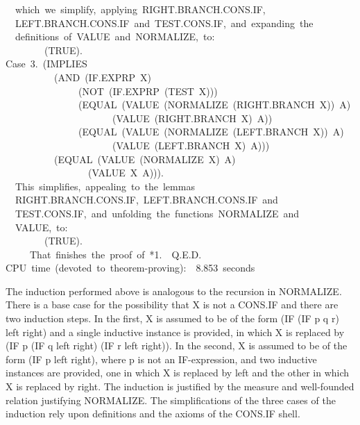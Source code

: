 \documentclass[11pt]{book}
\newenvironment{pubasis}{\begin{flushleft}\ttfamily\small}{\normalsize\rmfamily\end{flushleft}}
\begin{document}
\begin{pubasis}
~~which~we~simplify,~applying~RIGHT.BRANCH.CONS.IF,\\
~~LEFT.BRANCH.CONS.IF~and~TEST.CONS.IF,~and~expanding~the\\
~~definitions~of~VALUE~and~NORMALIZE,~to:\\

~~~~~~~~(TRUE).\\

Case~3.~(IMPLIES\\
~~~~~~~~~~(AND~(IF.EXPRP~X)\\
~~~~~~~~~~~~~~~(NOT~(IF.EXPRP~(TEST~X)))\\
~~~~~~~~~~~~~~~(EQUAL~(VALUE~(NOR\-MAL\-IZE~(RIGHT.BRANCH~X))~A)\\
~~~~~~~~~~~~~~~~~~~~~~(VALUE~(RIGHT.BRANCH~X)~A))\\
~~~~~~~~~~~~~~~(EQUAL~(VALUE~(NOR\-MAL\-IZE~(LEFT.BRANCH~X))~A)\\
~~~~~~~~~~~~~~~~~~~~~~(VALUE~(LEFT.BRANCH~X)~A)))\\
~~~~~~~~~~(EQUAL~(VALUE~(NORMALIZE~X)~A)\\
~~~~~~~~~~~~~~~~~(VALUE~X~A))).\\

~~This~simplifies,~appealing~to~the~lemmas\\
~~RIGHT.BRANCH.CONS.IF,~LEFT.BRANCH.CONS.IF~and\\
~~TEST.CONS.IF,~and~unfolding~the~functions~NOR\-MAL\-IZE~and\\
~~VALUE,~to:\\

~~~~~~~~(TRUE).\\

~~~~~That~finishes~the~proof~of~*1.~~Q.E.D.\\

CPU~time~(devoted~to~theorem-proving):~~8.853~seconds\\
\end{pubasis}
The induction performed above is analogous to the recursion in NORMALIZE.
There is a base case for the possibility that X is not a CONS.IF and
there are two induction steps.  In the first, X is assumed to be of the
form (IF (IF p q r) left right) and a single inductive instance is provided, in which X is replaced by
(IF p (IF q left right) (IF r left right)).  In the second, X is assumed to be of the
form (IF p left right), where p is not an IF-expression, and two inductive instances are
provided, one in which X is replaced by left and the other in which X is replaced by right.
The induction is justified by the measure and well-founded relation
justifying NORMALIZE.  The simplifications of the three cases of the induction
rely upon definitions and the axioms of the CONS.IF  shell.
\end{document}
